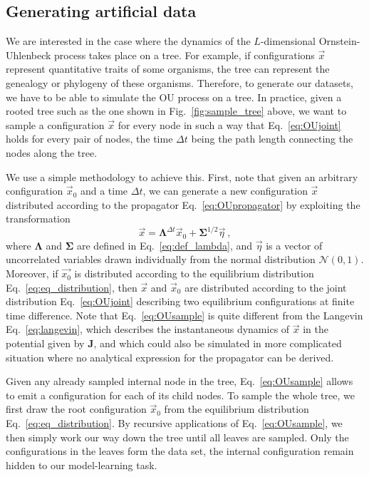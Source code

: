 \documentclass[preprint,amsmath,amssymb,superscriptaddress,showpacs,pre]{revtex4-1}
\def\vx{\vec x}
\newcommand{\Lam}{\bm{\Lambda}}
\newcommand{\Sig}{\bm{\Sigma}}
\begin{document}
\subsection{Generating artificial data} %
\label{sub:generating_artificial_data}

We are interested in the case where the dynamics of the $L$-dimensional Ornstein-Uhlenbeck process takes place on a tree. For example, if configurations $\vec{x}$ represent quantitative traits of some organisms, the tree can represent the genealogy or phylogeny of these organisms. Therefore, to generate our datasets, we have to be able to simulate the OU process on a tree. In practice, given a rooted tree such as the one shown in Fig.~\ref{fig:sample_tree} above, we want to sample a configuration $\vec{x}$ for every node in such a way that Eq.~\eqref{eq:OUjoint} holds for every pair of nodes, the time $\Delta t$ being the path length connecting the nodes along the tree. 
	
We use a simple methodology to achieve this. First, note that given an arbitrary configuration $\vec{x}_0$ and a time $\Delta t$, we can generate a new configuration $\vec{x}$ distributed according to the propagator Eq.~\eqref{eq:OUpropagator} by exploiting the transformation
\begin{equation}
	\vx = \Lam^{\Delta t}\vx_0 + \Sig^{1/2}\vec{\eta}\ ,
	\label{eq:OUsample}
\end{equation}
where $\Lam$ and $\Sig$ are defined in Eq.~\eqref{eq:def_lambda}, and $\vec{\eta}$ is a vector of uncorrelated variables drawn individually from the normal distribution $\mathcal{N}(0,1)$. Moreover, if $\vec{x_0}$ is distributed according to the equilibrium distribution Eq.~\eqref{eq:eq_distribution}, then $\vx$ and $\vx_0$ are distributed according to the joint distribution Eq.~\eqref{eq:OUjoint} describing two equilibrium configurations at finite time difference. Note that Eq.~\eqref{eq:OUsample} is quite different from the Langevin Eq.~\eqref{eq:langevin}, which describes the instantaneous dynamics of  $\vx$ in the potential given by $\bm{J}$, and which could also be simulated in more complicated situation where no analytical expression for the propagator can be derived. 
	
Given any already sampled internal node in the tree, Eq.~\eqref{eq:OUsample} allows to emit a configuration for each of its child nodes. To sample the whole tree, we first draw the root configuration $\vx_0$ from the equilibrium distribution Eq.~\eqref{eq:eq_distribution}. By recursive applications of Eq.~\eqref{eq:OUsample}, we then simply work our way down the tree until all leaves are sampled. Only the configurations in the leaves form the data set, the internal configuration remain hidden to our model-learning task.  
\end{document}
